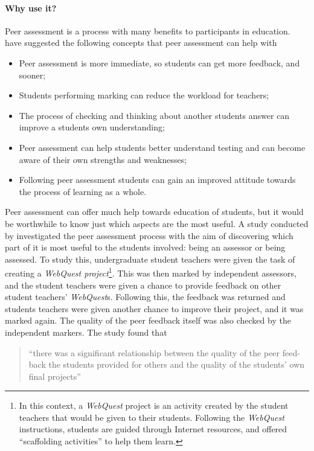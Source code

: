\documentclass[sigplan,10pt,review]{acmart}\settopmatter{printfolios=true}
\begin{document}
\paragraph{Why use it?}
Peer assessment is a process with many benefits to participants in
education. \citet{sadler_impact_2006} have suggested the
following concepts that peer assessment can help with
\begin{itemize}
\item Peer assessment is more immediate, so students can get more
  feedback, and sooner;
\item Students performing marking can reduce the workload for
  teachers;
\item The process of checking and thinking about another students
  answer can improve a students own understanding;
\item Peer assessment can help students better understand testing and
  can become aware of their own strengths and weaknesses;
\item Following peer assessment students can gain an improved attitude
  towards the process of learning as a whole.
\end{itemize}

Peer assessment can offer much help towards education of students, but
it would be worthwhile to know just which aspects are the most
useful. A study conducted by \citet{li_assessor_2010}
investigated the peer assessment process with the aim of discovering
which part of it is most useful to the students involved: being an
assessor or being assessed. To study this, undergraduate student teachers
were given the task of creating a \textit{WebQuest project}\footnote{In this
  context, a \textit{WebQuest} project is an activity created by the
  student teachers that would be given to their students. Following
  the \textit{WebQuest} instructions, students are guided through
  Internet resources, and offered ``scaffolding activities'' to help
  them learn.}. This was then marked by independent assessors,
and the student teachers were given a chance to provide feedback on
other student teachers' \textit{WebQuest}s. Following this, the
feedback was returned and students teachers were given another chance
to improve their project, and it was marked again. The quality of the
peer feedback itself was also checked by the independent markers. The
study found that

\begin{quote}
  ``there was a significant relationship between the quality of the
  peer feed-back the students provided for others and the quality of
  the students' own final projects''
\end{quote}
\end{document}
